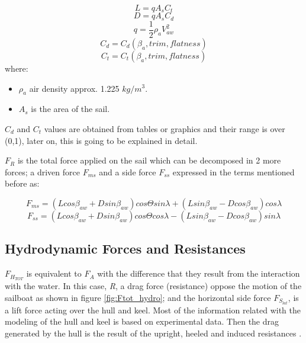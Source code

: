\begin{equation} \label{eq:Lift}
  L=qA_{s}C_{t}  
\end{equation}
\begin{equation} \label{eq:Draf}
    D=qA_{s}C_{d}  
\end{equation}
\begin{equation} \label{eq:dynamic_press}
    q=\frac{1}{2}\rho_{a} V_{aw}^2
\end{equation}
\begin{equation} \label{eq:Cd}
    C_{d}=C_{d}(\beta_{a},trim, flatness)
\end{equation}
\begin{equation} \label{eq:Ct}
    C_{t}=C_{t}(\beta_{a},trim, flatness)
\end{equation}
where:
\begin{itemize} \label{ae_symbols}
    \item $\rho_{a}$ air density approx. 1.225 $kg/m^3$.
    \item $A_{s}$ is the area of the sail.
\end{itemize}


$C_{d}$ and $C_{t}$ values are obtained from tables or graphics and their range is over (0,1), later on, this is going to be explained in detail. \par 
$F_{R}$ is the total force applied on the sail which can be decomposed in 2 more forces; a driven force $F_{ms}$ and a side force $F_{ss}$ expressed in the terms mentioned before as:\par
\begin{equation}\label{eq:drive_sail_force}
    F_{ms}= (L cos \beta_{aw}+ D sin \beta_{aw})cos \Theta sin \lambda + (L sin \beta_{aw}-D cos\beta_{aw})cos \lambda
\end{equation}
\begin{equation}\label{eq:side_sail_force}
    F_{ss}=(L cos \beta_{aw}+ D sin \beta_{aw})cos \Theta cos \lambda - (L sin \beta_{aw}-D cos\beta_{aw})sin \lambda
\end{equation}
\subsection {Hydrodynamic Forces and Resistances} \label{sec:hydroforces}
$F_{H_{TOT}}$ is equivalent to $F_{A}$ with the difference that they result from the interaction with the water. In this case, \textit{R}, a drag force (resistance) oppose the motion of the sailboat as shown in figure \ref{fig:Ftot_hydro}; and the horizontal side force $F_{S_{lat}}$, is a lift force acting over the hull and keel. Most of the information related with the modeling of the hull and keel is based on experimental data. %
Then the drag generated by the hull is the result of the  upright, heeled and induced resistances \cite{philpott1993yacht}.\par

